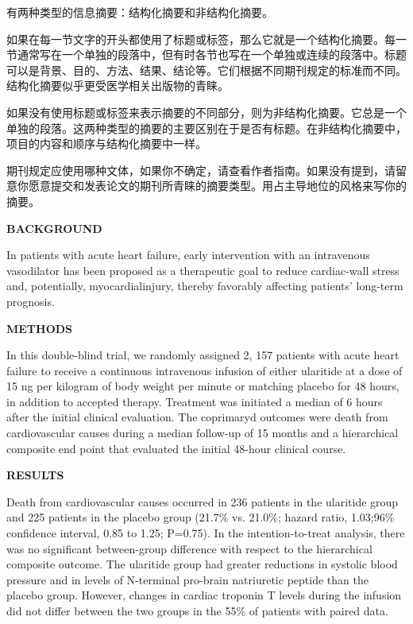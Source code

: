 \documentclass[a4paper]{ctexbook}
\begin{document}
有两种类型的信息摘要：结构化摘要和非结构化摘要。

如果在每一节文字的开头都使用了标题或标签，那么它就是一个结构化摘要。每一节通常写在一个单独的段落中，但有时各节也写在一个单独或连续的段落中。标题可以是背景、目的、方法、结果、结论等。它们根据不同期刊规定的标准而不同。结构化摘要似乎更受医学相关出版物的青睐。

如果没有使用标题或标签来表示摘要的不同部分，则为非结构化摘要。它总是一个单独的段落。这两种类型的摘要的主要区别在于是否有标题。在非结构化摘要中，项目的内容和顺序与结构化摘要中一样。

期刊规定应使用哪种文体，如果你不确定，请查看作者指南。如果没有提到，请留意你愿意提交和发表论文的期刊所青睐的摘要类型。用占主导地位的风格来写你的摘要。

\begin{sample}[label={myautocounter}]{\heiti}
  \textbf{BACKGROUND} 
  
  In patients with acute heart failure, early intervention with an intravenous vasodilator has been proposed as a therapeutic goal to reduce cardiac-wall stress and, potentially, myocardialinjury, thereby favorably affecting patients' long-term prognosis.

  \textbf{METHODS} 
  
  In this double-blind trial, we randomly assigned 2, 157 patients with acute heart failure to receive a continuous intravenous infusion of either ularitide at a dose of 15 ng per kilogram of body weight per minute or matching placebo for 48 hours, in addition to accepted therapy.
  Treatment was initiated a median of 6 hours after the initial clinical evaluation. The coprimaryd outcomes were death from cardiovascular causes during a median follow-up of 15 months and a hierarchical composite end point that evaluated the initial 48-hour clinical course.
  
  \textbf{RESULTS} 
  
  Death from cardiovascular causes occurred in 236 patients in the ularitide group and 225 patients in the placebo group (21.7\% vs. 21.0\%; hazard ratio, 1.03;96\% confidence interval, 0.85 to 1.25; P=0.75). In the intention-to-treat analysis, there was no significant between-group difference with respect to the hierarchical composite outcome. The ularitide group had greater reductions in systolic blood pressure and in levels of N-terminal pro-brain natriuretic peptide than the placebo group. However, changes in cardiac troponin T levels during the infusion did not differ between the two groups in the 55\% of patients with paired data.


\end{sample}
\end{document}
